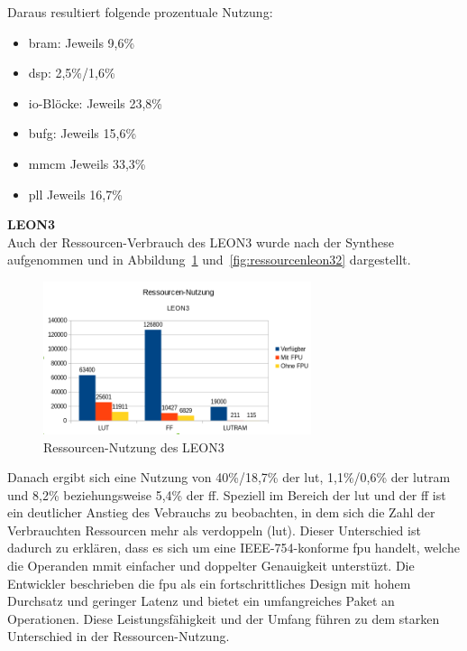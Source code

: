 Daraus resultiert folgende prozentuale Nutzung:\\
\begin{itemize}
  \item \ac{bram}: Jeweils 9,6\%
  \item \ac{dsp}: 2,5\%/1,6\%
  \item \ac{io}-Blöcke: Jeweils 23,8\%
  \item \ac{bufg}: Jeweils 15,6\%
  \item \ac{mmcm} Jeweils 33,3\%
  \item \ac{pll} Jeweils 16,7\%
\end{itemize}

\textbf{LEON3}\\

Auch der Ressourcen-Verbrauch des LEON3 wurde nach der Synthese aufgenommen und in Abbildung~\ref{fig:ressourcenleon31} und~\ref{fig:ressourcenleon32} dargestellt.\\

\begin{figure}[H]
\centering
\includegraphics[width=0.7\textwidth]{Hauptteil/ressourcennutzungleon31.png}
\caption{Ressourcen-Nutzung des LEON3}
\label{fig:ressourcenleon31}
\end{figure}

Danach ergibt sich eine Nutzung von 40\%/18,7\% der \ac{lut}, 1,1\%/0,6\% der \ac{lutram} und 8,2\% beziehungsweise 5,4\% der \ac{ff}.
Speziell im Bereich der \ac{lut} und der \ac{ff} ist ein deutlicher Anstieg des Vebrauchs zu beobachten, in dem sich die Zahl der Verbrauchten Ressourcen mehr als verdoppeln (\ac{lut}).
Dieser Unterschied ist dadurch zu erklären, dass es sich um eine IEEE-754-konforme \ac{fpu} handelt, welche die Operanden mmit einfacher und doppelter Genauigkeit unterstüzt. Die Entwickler
beschrieben die \ac{fpu} als ein fortschrittliches Design mit hohem Durchsatz und geringer Latenz und bietet ein umfangreiches Paket an Operationen. Diese Leistungsfähigkeit und der Umfang
führen zu dem starken Unterschied in der Ressourcen-Nutzung.\\

